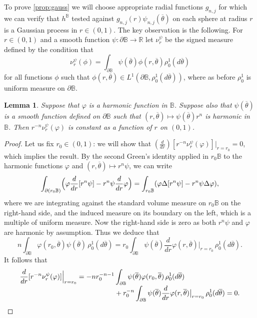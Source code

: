 \documentclass[JEP,XML,SOM,Unicode,published]{cedram}
\newtheorem{lemma}[theorem]{Lemma}
\theoremstyle{definition}
\newcommand{\R}{\mathbb{R}}
\newcommand{\B}{\mathbb{B}}\let\D\B\let\Ub\B
\let\ol\overline
\begin{document}
To prove \cref{prop:gauss} we will choose appropriate radial functions $g_{n,j}$ for which we can verify that $h^\B$ tested against $ g_{n,j}(r)\psi_{n,j}(\ol{\theta})$ on each sphere at radius $r$ is a Gaussian process in $r\in(0,1)$. The key observation is the following. For $r\in (0,1)$ and a smooth function $\psi: \partial \Ub \to \R$ let $\nu^\psi_r$ be the signed measure defined by the condition that
\begin{equation}\label{eq:av}
\nu^\psi_r(\phi)=\int_{\partial \Ub} \psi(\ol{\theta}) \phi(r,\ol{\theta}) \rho_0^1(d\ol{\theta})
\end{equation}
for all functions $\phi$ such that $\phi(r,\ol{\theta})\in L^1(\partial \Ub,\rho_0^1(d\ol{\theta}))$, where as before $\rho_0^1$ is uniform measure on $\partial \B$.

\begin{lemma}\label{lem:sin_const}
Suppose that $\varphi$ is a harmonic function in $\Ub$. Suppose also that $\psi(\ol{\theta})$ is a smooth function defined on $\partial \Ub$ such that $(r,\ol{\theta})\mapsto \psi(\ol{\theta})r^{n}$ is harmonic in $\Ub$. Then $r^{-n}\nu^\psi_r(\varphi)$ is constant {as a function of $r$ on $(0,1)$}.
\end{lemma}

\begin{proof}
Let us fix $r_0\in (0,1)$: we will show that $(\frac{d}{dr})[r^{-n}\nu_{r}^\psi(\varphi)]|_{r=r_0}=0$, which implies the result. By the second Green's identity applied in $r_0\Ub$ to the harmonic functions $\varphi$ and $(r,\ol{\theta})\mapsto r^n\psi$, we can write
\[
\int_{\partial (r_0\Ub)}\Bigl(\varphi\frac{d}{dr}[r^n\psi] - r^n\psi\frac{d}{dr}\varphi \Bigr) = \int_{r_0 \Ub} (\varphi \Delta[ r^n\psi] - r^n\psi \Delta \varphi),
\]
where we are integrating against the standard volume measure on $r_0\B$ on the right-hand side, and the induced measure on its boundary on the left, which is a multiple of uniform measure.
Now the right-hand side is zero as both $r^n\psi$ and $\varphi$ are harmonic by assumption. Thus we deduce that
\[
n\int_{\partial \Ub}\varphi(r_0,\ol{\theta})\psi(\ol{\theta}) \, \rho_0^1(d\ol{\theta})= r_0\int_{\partial \Ub}\psi(\ol{\theta})\frac{d}{dr}\varphi(r,\ol{\theta})\big|_{r=r_0} \, \rho_0^1(d\ol{\theta}).
\]
It follows that
\begin{align*}
\frac{d}{dr}[r^{-n}\nu^\psi_r(\varphi)]\Big|_{r=r_0}
= -nr_0^{-n-1}&\int_{\partial \Ub}\psi(\ol{\theta}) \varphi(r_0,\ol{\theta})\, \rho_0^1(d\ol{\theta})\\[-3pt]
&+ r_0^{-n}\int_{\partial \Ub}\psi(\ol{\theta})\frac{d}{dr}\varphi(r,\ol\theta)\big|_{r=r_0}\, \rho_0^1(d\ol{\theta}) = 0.\qedhere
\end{align*}
\end{proof}
\end{document}
